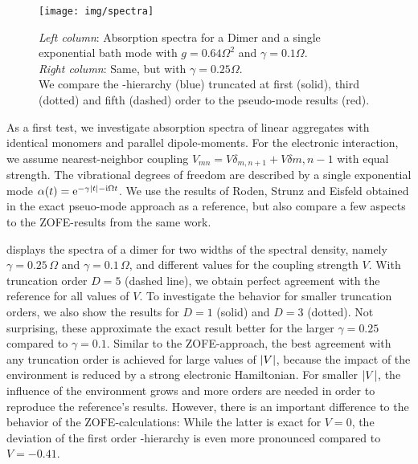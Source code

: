 \begin{figure}[p]
  \centering
  \texttt{[image: img/spectra]}
  \caption{%
    \emph{Left column}: Absorption spectra for a Dimer and a single exponential bath mode with $g=0.64\Omega^2$ and $\gamma = 0.1\Omega$.\\
    \emph{Right column}: Same, but with $\gamma = 0.25\Omega$.\\
    We compare the \NMSSE-hierarchy (blue) truncated at first (solid), third (dotted) and fifth (dashed) order to the pseudo-mode results (red).
  }
  \label{fig:app.spectra}
\end{figure}

As a first test, we investigate absorption spectra of linear aggregates with identical monomers and parallel dipole-moments.
For the electronic interaction, we assume nearest-neighbor coupling $V_{mn} = V\delta_{m,n+1} + V\delta{m, n-1}$ with equal strength.
The vibrational degrees of freedom are described by a single exponential mode $\alpha(t) = \exp[-\gamma\abs{t} - \ii\Omega t]$.
We use the results of Roden, Strunz and Eisfeld \cite{RoStEi11_nmqsd_aggregats} obtained in the exact pseuo-mode approach as a reference, but also compare a few aspects to the \textsc{ZOFE}-results from the same work.

 displays the spectra of a dimer for two widths of the spectral density, namely $\gamma=0.25\,\Omega$ and $\gamma=0.1\,\Omega$, and different values for the coupling strength $V$.
With truncation order $D = 5$ (dashed line), we obtain perfect agreement with the reference for all values of $V$.
To investigate the behavior for smaller truncation orders, we also show the results for $D=1$ (solid) and $D=3$ (dotted).
Not surprising, these approximate the exact result better for the larger $\gamma=0.25$ compared to $\gamma=0.1$.
Similar to the \textsc{ZOFE}-approach, the best agreement with any truncation order is achieved for large values of $\vert V \vert$, because the impact of the environment is reduced by a strong electronic Hamiltonian.
For smaller $\vert V \vert$, the influence of the environment grows and more orders are needed in order to reproduce the reference's results.
However, there is an important difference to the behavior of the \textsc{ZOFE}-calculations:
While the latter is exact for $V = 0$\cite{RoStEi11_nmqsd_aggregats}, the deviation of the first order \NMSSE-hierarchy is even more pronounced compared to $V=-0.41$.\\



